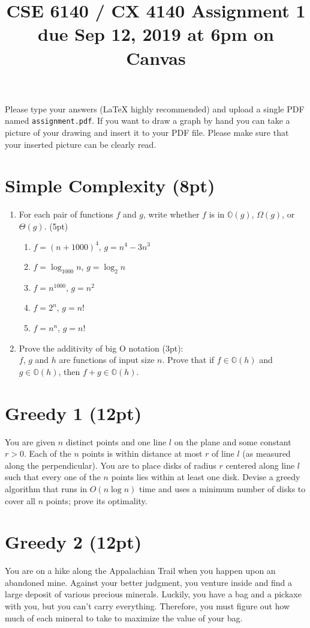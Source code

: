 \documentclass{article}
\title{CSE 6140 / CX 4140 Assignment 1\\due Sep 12, 2019 at 6pm on Canvas }
\author{}
\date{}
\begin{document}
\maketitle

Please type your answers (\LaTeX{} highly recommended) and upload a single PDF named \texttt{assignment.pdf}. If you want to draw a graph by hand you can take a picture of your drawing and insert it to your PDF file. Please make sure that your inserted picture can be clearly read.


\section{Simple Complexity (8pt)}
	\begin{enumerate}[label=\alph*)]
		\item For each pair of functions $f$ and $g$, write whether $f$ is in $\mathbb{O}(g)$, $\Omega(g)$, or $\Theta(g)$. (5pt)
		\begin{enumerate}
			\item $f = (n+1000)^4$, $g = n^4 - 3n^3$
			\item $f = \log_{1000} n$, $g = \log_2 n$
			\item $f = n^{1000}$, $g = n^2$
			\item $f = 2^n$, $g = n!$
			\item $f = n^n$, $g = n!$
		\end{enumerate}
		\item Prove the additivity of big O notation (3pt): \\
		$f$, $g$ and $h$ are functions of input size $n$. Prove that if $f \in \mathbb{O}(h)$ and $g \in \mathbb{O}(h)$, then $f+g \in \mathbb{O}(h)$. 
	\end{enumerate}



\section{Greedy 1 (12pt)}
You are given $n$ distinct points and one line $l$ on the plane and some constant $r > 0$. Each of the $n$ points is within distance at most $r$ of line $l$ (as measured along the perpendicular). You are to place disks of radius $r$ centered along line $l$ such that every one of the $n$ points lies within at least one disk. Devise a greedy algorithm that runs in $O(n\log n)$ time and uses a minimum number of disks to cover all $n$ points; prove its optimality.


\section{Greedy 2 (12pt)}
You are on a hike along the Appalachian Trail when you happen upon an abandoned mine. Against your better judgment, you venture inside and find a large deposit of various precious minerals. Luckily, you have a bag and a pickaxe with you, but you can't carry everything. Therefore, you must figure out how much of each mineral to take to maximize the value of your bag.
\end{document}
